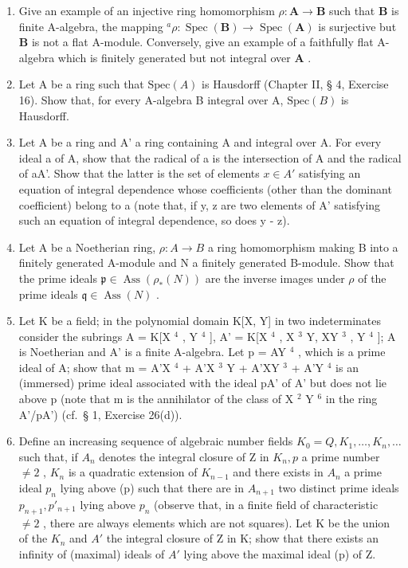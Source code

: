 
\begin{enumerate}
\def\labelenumi{\arabic{enumi}.}
\item
  Give an example of an injective ring homomorphism \(\rho: \mathbf{A} \to \mathbf{B}\) such that \(\mathbf{B}\) is finite A-algebra, the mapping \(^a\rho: \operatorname{Spec}(\mathbf{B}) \to \operatorname{Spec}(\mathbf{A})\) is surjective but \(\mathbf{B}\) is not a flat A-module. Conversely, give an example of a faithfully flat A-algebra which is finitely generated but not integral over \(\mathbf{A}\) .
\item
  Let A be a ring such that \(\text{Spec}(A)\) is Hausdorff (Chapter II, § 4, Exercise 16). Show that, for every A-algebra B integral over A, \(\text{Spec}(B)\) is Hausdorff.
\item
  Let A be a ring and A' a ring containing A and integral over A. For every ideal a of A, show that the radical of a is the intersection of A and the radical of aA'. Show that the latter is the set of elements \(x \in A'\) satisfying an equation of integral dependence whose coefficients (other than the dominant coefficient) belong to a (note that, if y, z are two elements of A' satisfying such an equation of integral dependence, so does y - z).
\item
  Let A be a Noetherian ring, \(\rho: A \to B\) a ring homomorphism making B into a finitely generated A-module and N a finitely generated B-module. Show that the prime ideals \(\mathfrak{p} \in \operatorname{Ass}(\rho_{*}(N))\) are the inverse images under \(\rho\) of the prime ideals \(\mathfrak{q} \in \operatorname{Ass}(N)\) .
\item
  Let K be a field; in the polynomial domain K{[}X, Y{]} in two indeterminates consider the subrings A = K{[}X \(^{4}\) , Y \(^{4}\) {]}, A' = K{[}X \(^{4}\) , X \(^{3}\) Y, XY \(^{3}\) , Y \(^{4}\) {]}; A is Noetherian and A' is a finite A-algebra. Let p = AY \(^{4}\) , which is a prime ideal of A; show that m = A'X \(^{4}\) + A'X \(^{3}\) Y + A'XY \(^{3}\) + A'Y \(^{4}\) is an (immersed) prime ideal associated with the ideal pA' of A' but does not lie above p (note that m is the annihilator of the class of X \(^{2}\) Y \(^{6}\) in the ring A'/pA') (cf.~§ 1, Exercise 26(d)).
\item
  Define an increasing sequence of algebraic number fields \(K_{0} = Q, K_{1}, \ldots, K_{n}, \ldots\) such that, if \(A_{n}\) denotes the integral closure of Z in \(K_{n}, p\) a prime number \(\neq 2\) , \(K_{n}\) is a quadratic extension of \(K_{n-1}\) and there exists in \(A_{n}\) a prime ideal \(p_{n}\) lying above (p) such that there are in \(A_{n+1}\) two distinct prime ideals \(p_{n+1}, p'_{n+1}\) lying above \(p_{n}\) (observe that, in a finite field of characteristic \(\neq 2\) , there are always elements which are not squares). Let K be the union of the \(K_{n}\) and \(A'\) the integral closure of Z in K; show that there exists an infinity of (maximal) ideals of \(A'\) lying above the maximal ideal (p) of Z.

\end{enumerate}
